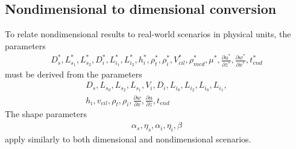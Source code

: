 \documentclass[10pt,a4paper]{article}
\def\non{\nonumber}
\def\p{\partial}
\begin{document}
\subsection{Nondimensional to dimensional conversion}
To relate nondimensional results to real-world scenarios in physical units, the parameters
\begin{eqnarray}\label{nd2dpars0}
	D^*_s, L^*_{s_1}, L^*_{s_2}, D^*_{i}, L^*_{i_1}, L^*_{i_2}, h^*_i, \rho^*_t, \rho^*_{i}, V^*_{cil}, \rho^*_{med}, \mu^*, \frac{\p u^*}{\p z^*}, \frac{\p w^*}{\p x^*}, t^*_{end}
\end{eqnarray}
must be derived from the parameters 
\begin{eqnarray}\label{nd2dpars1}
	D_s, L_{s_0}, L_{s_2}, L_{s_1}, V_i, D_i, L_{i_0}, L_{i_2}, L_{i_0}, L_{i_1}, \non \\
	h_i, v_{cil}, \rho_t, \rho_i, \frac{\p w}{\p x}, \frac{\p u}{\p z}, t_{end}
\end{eqnarray}
The shape parameters
\begin{eqnarray}\label{nd2dpars2}
	\alpha_s, \eta_s, \alpha_{i}, \eta_{i}, \beta
\end{eqnarray}
apply similarly to both dimensional and nondimensional scenarios.
\end{document}
